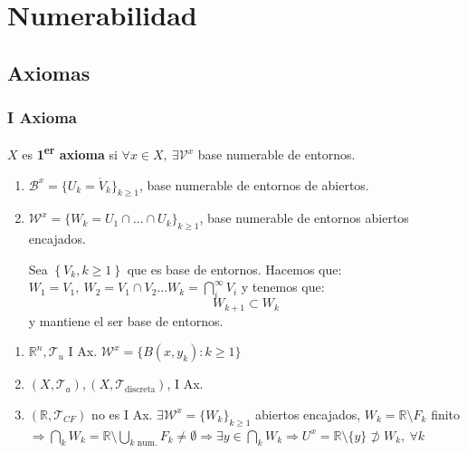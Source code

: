 \chapter{Numerabilidad}%
\label{cha:numerabilidad}

\section{Axiomas}%
\label{sec:axiomas}
\subsection{I Axioma}%
\label{sub:i_axioma}

\begin{defi}[I Ax.]
$X$ es \textbf{1\textsuperscript{er} axioma} si $\forall x \in X,\ \exists \mathcal{V}^x$ base numerable de entornos.  
\end{defi}

\begin{obs}
\begin{enumerate}
    \item $\mathcal{B}^x = \{U_k = \mathring{V}_k \}_{k \ge 1}$, base numerable de entornos de abiertos.
    \item $\mathcal{W}^x = \{W_k = U_1 \cap \ldots \cap U_k\}_{k \ge 1}$, base numerable de entornos abiertos encajados.
    \begin{demo}
        Sea $\left\{ V_k, k \ge 1 \right\}$ que es base de entornos. Hacemos que: $W_1 = V_1,\ W_2 = V_1 \cap V_2 \ldots W_k = \bigcap_{i}^{\infty} V_i$ y tenemos que:
        \[
        W_{k+1} \subset W_{k}
        \]
        y mantiene el ser base de entornos.
    \end{demo}
\end{enumerate}
\end{obs}

\begin{ej}
\begin{enumerate}
    \item $\mathbb{R}^n, \mathcal{T}_u$ I Ax. $\mathcal{W}^x = \{B\left( x, y_k \right): k \ge 1\}$ 
    \item $\left( X, \mathcal{T}_a \right), \left( X, \mathcal{T}_{\text{discreta}} \right)$, I Ax.
    \item $\left( \mathbb{R}, \mathcal{T}_{CF} \right)$ no es I Ax. $\exists \mathcal{W}^x = \{W_k\}_{k \ge 1}$ abiertos encajados, $W_k = \mathbb{R} \setminus F_k$ finito $\Rightarrow \bigcap_{k} W_k = \mathbb{R} \setminus \bigcup_{k \text{ num.}} F_k \neq \emptyset \Rightarrow \exists y \in \bigcap_{k} W_k \Rightarrow U^x = \mathbb{R}\setminus \{y\} \not \supset W_k,\ \forall k$ 
\end{enumerate}
\end{ej}

